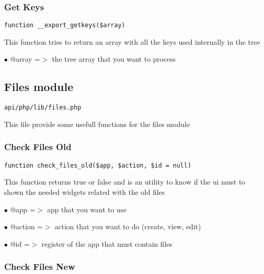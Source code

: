 \documentclass[a4paper]{article}
\begin{document}
\hypertarget{toc445}{}
\subsubsection{Get Keys}

\begin{lstlisting}
function __export_getkeys($array)
\end{lstlisting}

This function tries to return an array with all the keys used internally
in the tree

\begin{compactitem}
\item[\color{myblue}$\bullet$] @array =$>$ the tree array that you want to process
\end{compactitem}

\hypertarget{toc446}{}
\subsection{Files module}

\begin{lstlisting}
api/php/lib/files.php
\end{lstlisting}

This file provide some usefull functions for the files module

\hypertarget{toc447}{}
\subsubsection{Check Files Old}

\begin{lstlisting}
function check_files_old($app, $action, $id = null)
\end{lstlisting}

This function returns true or false and is an utility to know if the ui
must to shown the needed widgets related with the old files

\begin{compactitem}
\item[\color{myblue}$\bullet$] @app    =$>$ app that you want to use
\item[\color{myblue}$\bullet$] @action =$>$ action that you want to do (create, view, edit)
\item[\color{myblue}$\bullet$] @id     =$>$ register of the app that must contain files
\end{compactitem}

\hypertarget{toc448}{}
\subsubsection{Check Files New}
\end{document}
